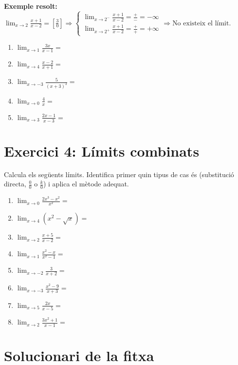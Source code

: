 \documentclass[12pt,a4paper]{article}
\begin{document}
\textbf{Exemple resolt:} 
$\lim_{x \to 2} \frac{x+1}{x-2} = \left[ \frac{3}{0} \right] \Rightarrow \begin{cases} 
      \lim_{x \to 2^-} \frac{x+1}{x-2} = \frac{+}{-} = -\infty \\
      \lim_{x \to 2^+} \frac{x+1}{x-2} = \frac{+}{+} = +\infty 
   \end{cases} \Rightarrow \text{No existeix el límit.}$

\begin{enumerate}[label=\textbf{\alph*)}]
    \itemsep2.5em
    \item $\lim_{x \to 1} \frac{3x}{x-1} =$
    \item $\lim_{x \to 4} \frac{x-2}{x+1} =$
    \item $\lim_{x \to -3} \frac{5}{(x+3)^2} =$
    \item $\lim_{x \to 0} \frac{4}{x} =$
    \item $\lim_{x \to 3} \frac{2x - 1}{x - 3} =$
\end{enumerate}

\newpage

\section*{Exercici 4: Límits combinats}
Calcula els següents límits. Identifica primer quin tipus de cas és (substitució directa, $\frac{0}{0}$ o $\frac{k}{0}$) i aplica el mètode adequat.

\begin{enumerate}[label=\textbf{\arabic*.}]
    \itemsep3em
    \item $\lim_{x \to 0} \frac{2x^3 - x^2}{x^2} =$
    \item $\lim_{x \to 4} (x^2 - \sqrt{x}) =$
    \item $\lim_{x \to 2} \frac{x+5}{x-2} =$
    \item $\lim_{x \to 1} \frac{x^2 - x}{x^2 - 1} =$
    \item $\lim_{x \to -2} \frac{3}{x+2} =$
    \item $\lim_{x \to -3} \frac{x^2 - 9}{x+3} =$
    \item $\lim_{x \to 5} \frac{2x}{x-5} =$
    \item $\lim_{x \to 2} \frac{3x^2 + 1}{x - 1} =$
\end{enumerate}

\newpage

\section*{Solucionari de la fitxa}
\end{document}
